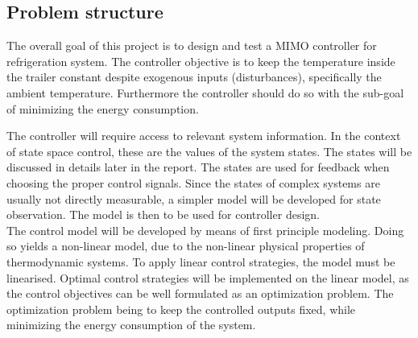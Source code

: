 \subsection{Problem structure}
The overall goal of this project is to design and test a MIMO controller for refrigeration system. The controller objective is to keep the temperature inside the trailer constant despite exogenous inputs (disturbances), specifically the ambient temperature.
Furthermore the controller should do so with the sub-goal of minimizing the energy consumption.

The controller will require access to relevant system information. In the context of state space control, these are the values of the system states. The states will be discussed in details later in the report. The states are used for feedback when choosing the proper control signals. Since the states of complex systems are usually not directly measurable, a simpler model will be developed for state observation. The model is then to be used for controller design. \\
The control model will be developed by means of first principle modeling. Doing so yields a non-linear model, due to the non-linear physical properties of thermodynamic systems. To apply linear control strategies, the model must be linearised. Optimal control strategies will be implemented on the linear model, as the control objectives can be well formulated as an optimization problem. The optimization problem being to keep the controlled outputs fixed, while minimizing the energy consumption of the system.\\






